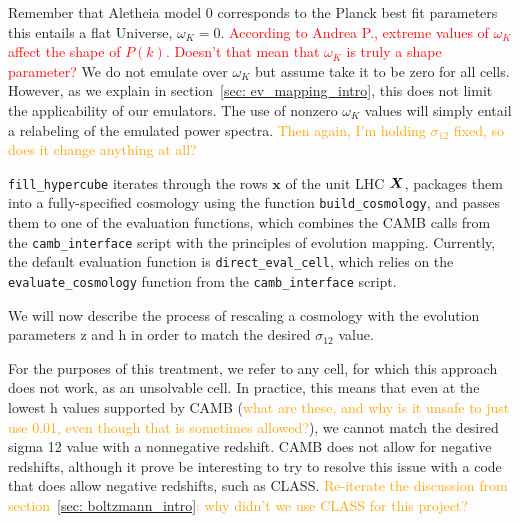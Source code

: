 
Remember that Aletheia model 0 corresponds to the Planck best fit parameters
this entails a flat Universe, $\omega_K = 0$.
\textcolor{red}{According to Andrea P., extreme values of $\omega_K$
affect the shape of $P(k)$. Doesn't that mean that $\omega_K$ is truly a
shape parameter?} We do not emulate over $\omega_K$ but assume take
it to be zero for all cells. However, as we explain in
section~\ref{sec: ev_mapping_intro}, this does not limit the applicability of
our emulators. The use of nonzero $\omega_K$ values will simply entail a
relabeling of the emulated power spectra. \textcolor{orange}{Then again, I'm
holding $\sigma_{12}$ fixed, so does it change anything at all?}


\verb|fill_hypercube| iterates through the rows $\bm{x}$ of the unit LHC
$\bm{X}$, packages them into a fully-specified cosmology using the function
\verb|build_cosmology|, and passes them to one of the evaluation functions,
which combines the CAMB calls from the \verb|camb_interface| script with the
principles of evolution mapping. Currently, the default evaluation function is
\verb|direct_eval_cell|, which relies on the \verb|evaluate_cosmology|
function from the \verb|camb_interface| script.

% 


We will now describe the process of rescaling a cosmology with the evolution 
parameters z and h in order to match the desired $\sigma_{12}$ value.

For the purposes of this treatment, we refer to any cell, for which this 
approach does not work, as an unsolvable cell. In practice, this means that 
even at the lowest h values supported by CAMB (\textcolor{orange}{what are 
these, and why is it unsafe to just use 0.01, even though that is sometimes 
allowed?}), we cannot match the desired sigma 12 value with a nonnegative 
redshift. CAMB does not allow for negative redshifts, although it prove be 
interesting to try to resolve this issue with a code that does allow negative 
redshifts, such as CLASS. \textcolor{orange}{Re-iterate the discussion from
section~\ref{sec: boltzmann_intro}: why didn’t we use CLASS for this project?}


